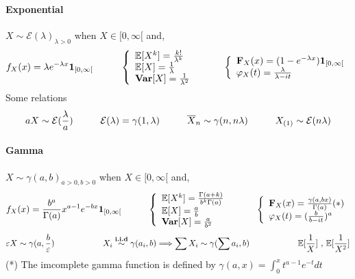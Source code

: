 \documentclass[a4paper,10pt]{article}
\begin{document}
\paragraph{Exponential} $X\sim \mathcal{E}(\lambda)_{\lambda>0}$ when $X \in [0,\infty[$ and,
\[
f_{X}(x) = \lambda e^{-\lambda x} \mathbf{1}_{[0,\infty[}
\hspace{10mm}
\left\{
\begin{array}{l}
\mathbb{E}[X^k]=\frac{k!}{\lambda^k} \\
\mathbb{E}[X]=\frac{1}{\lambda} \\
\textbf{Var}[X]=\frac{1}{\lambda^2} 
\end{array}\right.
\hspace{10mm}
\left\{
\begin{array}{l}
\textbf{F}_X(x) = (1- e^{-\lambda x})\mathbf{1}_{[0,\infty[} \\
\varphi_{X}(t) = \frac{\lambda}{\lambda - it}
\end{array}\right.
\]
Some relations
\[
aX \sim \mathcal{E}(\frac{\lambda}{a})
\hspace{10mm}
\mathcal{E}(\lambda) = \gamma(1,\lambda)
\hspace{10mm}
\overline{X}_n \sim \gamma(n,n\lambda)
\hspace{10mm}
X_{(1)} \sim \mathcal{E}(n\lambda)
\]

\paragraph{Gamma} $X\sim \gamma(a,b)_{a>0,b>0}$ when $X \in [0,\infty[$ and,
\[
f_{X}(x) = \frac{b^a}{\Gamma(a)} x^{a-1} e^{-bx} \mathbf{1}_{[0,\infty[}
\hspace{10mm}
\left\{
\begin{array}{l}
\mathbb{E}[X^k]=\frac{\Gamma(a+k)}{b^k\Gamma(a)} \\
\mathbb{E}[X]=\frac{a}{b} \\
\textbf{Var}[X]=\frac{a}{b^2} 
\end{array}\right.
\hspace{10mm}
\left\{
\begin{array}{l}
\textbf{F}_X(x) = \frac{\gamma(a,bx)}{\Gamma(a)} (*)  \\
\varphi_{X}(t) = (\frac{b}{b - it})^a
\end{array}\right.
\]
\[
\varepsilon X \sim \gamma(a,\frac{b}{\varepsilon})
\hspace{20mm}
X_i \stackrel{\textbf{i.i.d}}{\sim} \gamma(a_i,b) \Longrightarrow \sum X_i \sim \gamma(\sum a_i, b)
\hspace{20mm}
\mathbb{E}[\frac{1}{X}] \text{ , } \mathbb{E}[\frac{1}{X^2}]
\]
(*) The imcomplete gamma function is defined by $\gamma(a,x) = \int_{0}^{x} t^{a-1}e^{-t}dt $
\end{document}
